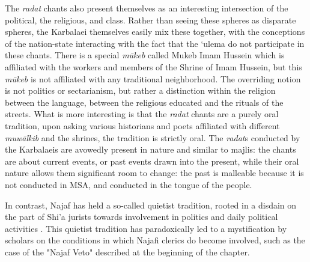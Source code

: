 The \emph{radat} chants also present themselves as an interesting intersection of the political, the religious, and class. Rather than seeing these spheres as disparate spheres, the Karbalaei themselves easily mix these together, with the conceptions of the nation-state interacting with the fact that the ‘ulema do not participate in these chants. There is a special \emph{mūkeb} called Mukeb Imam Hussein which is affiliated with the workers and members of the Shrine of Imam Hussein, but this \emph{mūkeb} is not affiliated with any traditional neighborhood. The overriding notion is not politics or sectarianism, but rather a distinction within the religion between the language, between the religious educated and the rituals of the streets. What is more interesting is that the \emph{radat} chants are a purely oral tradition, upon asking various historians and poets affiliated with different \emph{muwālkib} and the shrines, the tradition is strictly oral. The \emph{radat}s conducted by the Karbalaeis are avowedly present in nature and similar to majlis: the chants are about current events, or past events drawn into the present, while their oral nature allows them significant room to change: the past is malleable because it is not conducted in MSA, and conducted in the tongue of the people. 

In contrast, Najaf has held a so-called quietist tradition, rooted in a disdain on the part of Shi'a jurists towards involvement in politics and daily political activities \cite[216]{hamdan_development_2012}. This quietist tradition has paradoxically led to a mystification by scholars on the conditions in which Najafi clerics do become involved, such as the case of the "Najaf Veto" described at the beginning of the chapter. 

